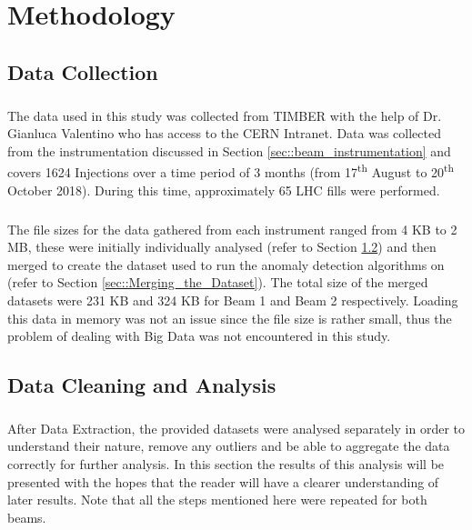 \chapter{Methodology}

\section{Data Collection}
\paragraph{ }The data used in this study was collected from \ac{TIMBER} with the help of Dr. Gianluca Valentino who has access to the \acs{CERN} Intranet. Data was collected from the instrumentation discussed in Section \ref{sec::beam_instrumentation} and covers 1624 Injections over a time period of 3 months (from 17\textsuperscript{th} August to 20\textsuperscript{th} October 2018). During this time, approximately 65 \acs{LHC} fills were performed.

\paragraph{ }The file sizes for the data gathered from each instrument ranged from 4 KB to 2 MB, these were initially individually analysed (refer to Section \ref{sec::Data_Cleaning_and_Analysis}) and then merged to create the dataset used to run the anomaly detection algorithms on (refer to Section \ref{sec::Merging_the_Dataset}). The total size of the merged datasets were 231 KB and 324 KB for Beam 1 and Beam 2 respectively. Loading this data in memory was not an issue since the file size is rather small, thus the problem of dealing with Big Data was not encountered in this study.

\section{Data Cleaning and Analysis}
\label{sec::Data_Cleaning_and_Analysis}
\paragraph{ }After Data Extraction, the provided datasets were analysed separately in order to understand their nature, remove any outliers and be able to aggregate the data correctly for further analysis. In this section the results of this analysis will be presented with the hopes that the reader will have a clearer understanding of later results. Note that all the steps mentioned here were repeated for both beams.

